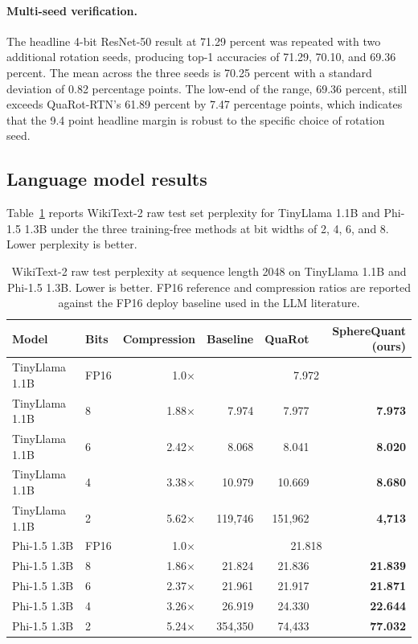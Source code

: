 \paragraph{Multi-seed verification.}
The headline 4-bit ResNet-50 result at 71.29 percent was repeated with
two additional rotation seeds, producing top-1 accuracies of 71.29,
70.10, and 69.36 percent. The mean across the three seeds is 70.25
percent with a standard deviation of 0.82 percentage points. The
low-end of the range, 69.36 percent, still exceeds QuaRot-RTN's
61.89 percent by 7.47 percentage points, which indicates that the 9.4
point headline margin is robust to the specific choice of rotation
seed.

\subsection{Language model results}
\label{sec:experiments-llm}

Table~\ref{tab:llm} reports WikiText-2 raw test set perplexity for
TinyLlama 1.1B and Phi-1.5 1.3B under the three training-free methods
at bit widths of 2, 4, 6, and 8. Lower perplexity is better.

\begin{table}[t]
\centering
\caption{WikiText-2 raw test perplexity at sequence length 2048 on
TinyLlama 1.1B and Phi-1.5 1.3B. Lower is better. FP16 reference and
compression ratios are reported against the FP16 deploy baseline used
in the LLM literature.}
\label{tab:llm}
\begin{tabular}{llrrrr}
\hline
Model & Bits & Compression & Baseline & QuaRot & SphereQuant (ours) \\
\hline
TinyLlama 1.1B & FP16 & 1.0$\times$ & \multicolumn{3}{c}{7.972} \\
TinyLlama 1.1B & 8 & 1.88$\times$ & 7.974 & 7.977 & \textbf{7.973} \\
TinyLlama 1.1B & 6 & 2.42$\times$ & 8.068 & 8.041 & \textbf{8.020} \\
TinyLlama 1.1B & 4 & 3.38$\times$ & 10.979 & 10.669 & \textbf{8.680} \\
TinyLlama 1.1B & 2 & 5.62$\times$ & 119{,}746 & 151{,}962 & \textbf{4{,}713} \\
\hline
Phi-1.5 1.3B & FP16 & 1.0$\times$ & \multicolumn{3}{c}{21.818} \\
Phi-1.5 1.3B & 8 & 1.86$\times$ & 21.824 & 21.836 & \textbf{21.839} \\
Phi-1.5 1.3B & 6 & 2.37$\times$ & 21.961 & 21.917 & \textbf{21.871} \\
Phi-1.5 1.3B & 4 & 3.26$\times$ & 26.919 & 24.330 & \textbf{22.644} \\
Phi-1.5 1.3B & 2 & 5.24$\times$ & 354{,}350 & 74{,}433 & \textbf{77.032} \\
\hline
\end{tabular}
\end{table}

